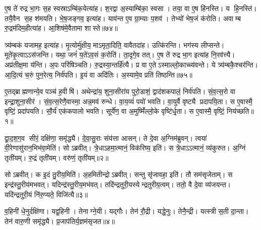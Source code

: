 ए॒ष ते॑ रुद्र भा॒गः स॒ह स्वस्राऽम्बि॑क॒येत्या॑ह।
श॒रद्वा अ॒स्याम्बि॑का॒ स्वसा।
तया॒ वा ए॒ष हि॑नस्ति।
य हि॒नस्ति॑।
तयै॒वैन स॒ह श॑मयति।
भे॒ष॒जङ्गव॒ इत्या॑ह।
याव॑न्त ए॒व ग्रा॒म्याः प॒शव॑।
तेभ्यो॑ भेष॒जं क॑रोति।
अवाम्ब रु॒द्रम॑दिम॒हीत्या॑ह।
आ॒शिष॑मे॒वैतामा शास्ते॥७४॥

त्र्य॑म्बकं यजामह॒ इत्या॑ह।
मृ॒त्योर्मु॑क्षीय॒ माऽमृता॒दिति॒ वावैतदा॑ह।
उत्कि॑रन्ति।
भग॑स्य लीप्सन्ते।
मूते॑कृ॒त्वा\-ऽऽस॑जन्ति।
यथा॒ जनं॑ य॒ते॑ऽव॒सं क॒रोति॑।
ता॒दृगे॒व तत्।
ए॒ष ते॑ रुद्र भा॒ग इत्या॑ह नि॒रव॑त्त्यै।
अप्र॑तीक्ष॒मा य॑न्ति।
अ॒पः परि॑षिञ्चति।
रु॒द्रस्या॒न्तर्\mbox{}हि॑त्यै।
प्र वा ए॒तेऽस्माल्लो॒काच्च्य॑वन्ते।
ये त्र्य॑म्बकै॒श्चर॑न्ति।
आ॒दि॒त्यं च॒रुं पुन॒रेत्य॒ निर्व॑पति।
इ॒यं वा अदि॑तिः।
अ॒स्यामे॒व प्रति॑ तिष्ठन्ति॥७५॥\anuvakamend[य॒न्ति॒ ब्रू॒या॒न्नि॒रव॑दयते शास्ते सिञ्चति॒ षट्च॑]




\clearpage
{}
\setcounter{anuvakam}{0}

ए॒तद्ब्राह्मणान्ये॒व पञ्च॑ ह॒वीषि॑।
अथेन्द्रा॑य॒ शुना॒सीरा॑य पुरो॒डाशं॒ द्वाद॑शकपालं॒ निर्व॑पति।
सं॒व॒त्स॒रो वा इन्द्रा॒शुना॒सीर॑।
सं॒व॒त्स॒रेणै॒वास्मा॒ अन्न॒मव॑ रुन्धे।
वा॒य॒व्यं॑ पयो॑ भवति।
वा॒युर्वै वृष्ट्यै प्रदापयि॒ता।
स ए॒वास्मै॒ वृष्टिं॒ प्रदा॑पयति।
सौ॒र्य॑ एक॑कपालो भवति।
सूर्ये॑ण॒ वा अ॒मुष्मिँ॑ल्लो॒के वृष्टि॑र्धृ॒ता।
स ए॒वास्मै॒ वृष्टिं॒ निय॑च्छति॥१॥

द्वा॒द॒श॒ग॒व सीरं॒ दक्षि॑णा॒ समृ॑द्ध्यै।
दे॒वा॒सु॒राः संय॑त्ता आसन्।
ते दे॒वा अ॒ग्निम॑ब्रुवन्।
त्वया॑ वी॒रेणासु॑रान॒भिभ॑वा॒मेति॑।
सोऽब्रवीत्।
त्रे॒धाऽहमा॒त्मानं॒ विक॑रिष्य॒ इति॑।
स त्रे॒धाऽऽत्मानं॒ व्य॑कुरुत।
अ॒ग्निं तृती॑यम्।
रु॒द्रं तृती॑यम्।
वरु॑णं॒ तृती॑यम्॥२॥

सोऽब्रवीत्।
क इ॒दं तु॒रीय॒मिति॑।
अ॒हमितीन्द्रोऽब्रवीत्।
सन्तु सृ॑जावहा॒ इति॑।
तौ सम॑सृजेताम्।
स इन्द्र॑स्तु॒रीय॑मभवत्।
यदिन्द्र॑स्तु॒रीय॒मभ॑वत्।
तदि॑न्द्रतुरी॒यस्येन्द्रतुरीय॒त्वम्।
ततो॒ वै दे॒वा व्य॑जयन्त।
यदि॑न्द्रतुरी॒यं नि॑रु॒प्यते॒ विजि॑त्यै॥३॥

व॒हिनी॑ धे॒नुर्दक्षि॑णा।
यद्व॒हिनी।
तेनाग्ने॒यी।
यद्गौः।
तेन॑ रौ॒द्री।
यद्धे॒नुः।
तेनै॒न्द्री।
यत्स्त्री स॒ती दा॒न्ता।
तेन॑ वारु॒णी समृ॑द्ध्यै।
प्र॒जाप॑तिर्य॒ज्ञम॑सृजत॥४॥

